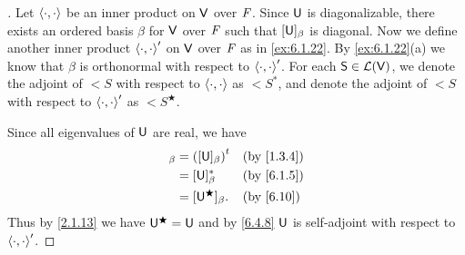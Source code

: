 \begin{proof}[]
  Let \(\left\langle\cdot, \cdot\right\rangle\) be an inner product on \(\mathsf{V}\) over \(\mathit{F}\).
  Since \(\mathsf{U}\) is diagonalizable, there exists an ordered basis \(\beta\) for \(\mathsf{V}\) over \(\mathit{F}\) such that \([\mathsf{U}]_{\beta}\) is diagonal.
  Now we define another inner product \(\left\langle\cdot, \cdot\right\rangle'\) on \(\mathsf{V}\) over \(\mathit{F}\) as in \cref{ex:6.1.22}.
  By \cref{ex:6.1.22}(a) we know that \(\beta\) is orthonormal with respect to \(\left\langle\cdot, \cdot\right\rangle'\).
  For each \(\mathsf{S} \in \mathcal{L}(\mathsf{V})\), we denote the adjoint of \(\lt{S}\) with respect to \(\left\langle\cdot, \cdot\right\rangle\) as \(\lt{S}^*\), and denote the adjoint of \(\lt{S}\) with respect to \(\left\langle\cdot, \cdot\right\rangle'\) as \(\lt{S}^{\bigstar}\).

  Since all eigenvalues of \(\mathsf{U}\) are real, we have
  \begin{align*}
    [\U]_{\beta} & = \tp{([\U]_{\beta})}      &  & \by{1.3.4} \\
                 & = [\U]_{\beta}^*           &  & \by{6.1.5} \\
                 & = [\U^{\bigstar}]_{\beta}. &  & \by{6.10}
  \end{align*}
  Thus by \cref{2.1.13} we have \(\mathsf{U}^{\bigstar} = \mathsf{U}\) and by \cref{6.4.8} \(\mathsf{U}\) is self-adjoint with respect to \(\left\langle\cdot, \cdot\right\rangle'\).


\end{proof}
